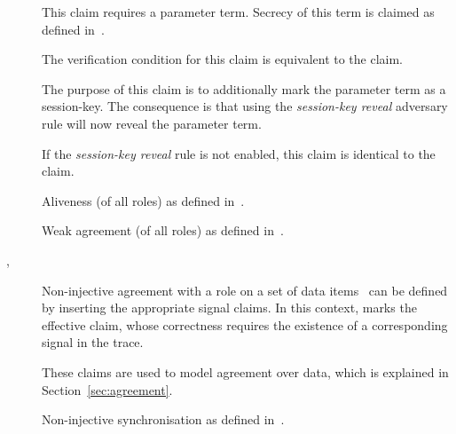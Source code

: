 \documentclass{book}
\begin{document}
\begin{description}

	

  \item[]

  	This claim requires a parameter term. Secrecy of this term is
	claimed as defined in~\cite{opsembook}.

  \item[]

	  The verification condition for this claim is equivalent to the  claim. 

	  The purpose of this claim is to additionally mark the parameter term as a session-key.
	  The consequence is that using the \emph{session-key reveal}
	  adversary rule will now reveal the parameter term.

	  If the \emph{session-key reveal} rule is not enabled, this
	  claim is identical to the  claim.

  \item[]

	  Aliveness (of all roles) as defined in~\cite{lowe97hierarchy}.

  \item[]

	  Weak agreement (of all roles) as defined in~\cite{lowe97hierarchy}.

  \item[,  ]

	  Non-injective agreement with a role on a set of data
	  items~\cite{lowe97hierarchy} can be defined by
	  inserting the appropriate signal claims.
	  In this context,  marks the effective claim, whose
	  correctness requires the existence of a corresponding
	   signal in the trace.

	  These claims are used to model agreement over data, which is
	  explained in Section~\ref{sec:agreement}.





  \item[]

  	Non-injective synchronisation as defined in~\cite{opsembook}.


\end{description}
\end{document}
